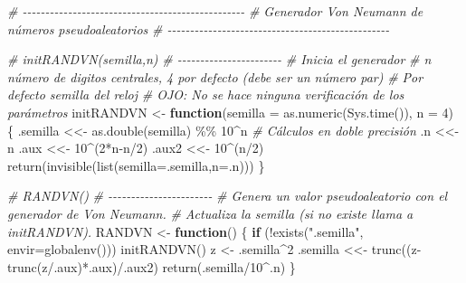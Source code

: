 \documentclass[
]{book}
\newenvironment{Shaded}{\begin{snugshade}}{\end{snugshade}}
\newcommand{\AttributeTok}[1]{\textcolor[rgb]{0.77,0.63,0.00}{#1}}
\newcommand{\CommentTok}[1]{\textcolor[rgb]{0.56,0.35,0.01}{\textit{#1}}}
\newcommand{\ControlFlowTok}[1]{\textcolor[rgb]{0.13,0.29,0.53}{\textbf{#1}}}
\newcommand{\DecValTok}[1]{\textcolor[rgb]{0.00,0.00,0.81}{#1}}
\newcommand{\FunctionTok}[1]{\textcolor[rgb]{0.00,0.00,0.00}{#1}}
\newcommand{\NormalTok}[1]{#1}
\newcommand{\OtherTok}[1]{\textcolor[rgb]{0.56,0.35,0.01}{#1}}
\newcommand{\SpecialCharTok}[1]{\textcolor[rgb]{0.00,0.00,0.00}{#1}}
\newcommand{\StringTok}[1]{\textcolor[rgb]{0.31,0.60,0.02}{#1}}
\theoremstyle{break}
\theoremstyle{definition}
\theoremstyle{definition}
\theoremstyle{definition}
\theoremstyle{definition}
\theoremstyle{remark}
\begin{document}
\begin{Shaded}
\begin{Highlighting}[]
\CommentTok{\# {-}{-}{-}{-}{-}{-}{-}{-}{-}{-}{-}{-}{-}{-}{-}{-}{-}{-}{-}{-}{-}{-}{-}{-}{-}{-}{-}{-}{-}{-}{-}{-}{-}{-}{-}{-}{-}{-}{-}{-}{-}{-}{-}{-}{-}{-}{-}{-}{-}}
\CommentTok{\# Generador Von Neumann de números pseudoaleatorios}
\CommentTok{\# {-}{-}{-}{-}{-}{-}{-}{-}{-}{-}{-}{-}{-}{-}{-}{-}{-}{-}{-}{-}{-}{-}{-}{-}{-}{-}{-}{-}{-}{-}{-}{-}{-}{-}{-}{-}{-}{-}{-}{-}{-}{-}{-}{-}{-}{-}{-}{-}{-}}

\CommentTok{\# initRANDVN(semilla,n)}
\CommentTok{\# {-}{-}{-}{-}{-}{-}{-}{-}{-}{-}{-}{-}{-}{-}{-}{-}{-}{-}{-}{-}{-}{-}{-}}
\CommentTok{\#   Inicia el generador }
\CommentTok{\#   n número de digitos centrales, 4 por defecto (debe ser un número par)}
\CommentTok{\#   Por defecto semilla del reloj}
\CommentTok{\#   OJO: No se hace ninguna verificación de los parámetros}
\NormalTok{initRANDVN }\OtherTok{\textless{}{-}} \ControlFlowTok{function}\NormalTok{(}\AttributeTok{semilla =} \FunctionTok{as.numeric}\NormalTok{(}\FunctionTok{Sys.time}\NormalTok{()), }\AttributeTok{n =} \DecValTok{4}\NormalTok{) \{}
\NormalTok{  .semilla }\OtherTok{\textless{}\textless{}{-}} \FunctionTok{as.double}\NormalTok{(semilla) }\SpecialCharTok{\%\%} \DecValTok{10}\SpecialCharTok{\^{}}\NormalTok{n  }\CommentTok{\# Cálculos en doble precisión}
\NormalTok{  .n }\OtherTok{\textless{}\textless{}{-}}\NormalTok{ n}
\NormalTok{  .aux }\OtherTok{\textless{}\textless{}{-}} \DecValTok{10}\SpecialCharTok{\^{}}\NormalTok{(}\DecValTok{2}\SpecialCharTok{*}\NormalTok{n}\SpecialCharTok{{-}}\NormalTok{n}\SpecialCharTok{/}\DecValTok{2}\NormalTok{)}
\NormalTok{  .aux2 }\OtherTok{\textless{}\textless{}{-}} \DecValTok{10}\SpecialCharTok{\^{}}\NormalTok{(n}\SpecialCharTok{/}\DecValTok{2}\NormalTok{)}
  \FunctionTok{return}\NormalTok{(}\FunctionTok{invisible}\NormalTok{(}\FunctionTok{list}\NormalTok{(}\AttributeTok{semilla=}\NormalTok{.semilla,}\AttributeTok{n=}\NormalTok{.n)))}
\NormalTok{\}}

\CommentTok{\# RANDVN()}
\CommentTok{\# {-}{-}{-}{-}{-}{-}{-}{-}{-}{-}{-}{-}{-}{-}{-}{-}{-}{-}{-}{-}{-}{-}{-}}
\CommentTok{\#   Genera un valor pseudoaleatorio con el generador de Von Neumann.}
\CommentTok{\#   Actualiza la semilla (si no existe llama a initRANDVN).}
\NormalTok{RANDVN }\OtherTok{\textless{}{-}} \ControlFlowTok{function}\NormalTok{() \{}
    \ControlFlowTok{if}\NormalTok{ (}\SpecialCharTok{!}\FunctionTok{exists}\NormalTok{(}\StringTok{".semilla"}\NormalTok{, }\AttributeTok{envir=}\FunctionTok{globalenv}\NormalTok{())) }\FunctionTok{initRANDVN}\NormalTok{()}
\NormalTok{    z }\OtherTok{\textless{}{-}}\NormalTok{ .semilla}\SpecialCharTok{\^{}}\DecValTok{2}
\NormalTok{    .semilla }\OtherTok{\textless{}\textless{}{-}} \FunctionTok{trunc}\NormalTok{((z}\SpecialCharTok{{-}}\FunctionTok{trunc}\NormalTok{(z}\SpecialCharTok{/}\NormalTok{.aux)}\SpecialCharTok{*}\NormalTok{.aux)}\SpecialCharTok{/}\NormalTok{.aux2)}
    \FunctionTok{return}\NormalTok{(.semilla}\SpecialCharTok{/}\DecValTok{10}\SpecialCharTok{\^{}}\NormalTok{.n)}
\NormalTok{\}}


\end{Highlighting}
\end{Shaded}
\end{document}
